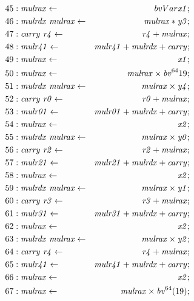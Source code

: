 {\begin{align*}
45 &: \mathit{mulrax} \leftarrow & bvVar \mathit{x1}; \\
46 &: \mathit{mulrdx}\ \mathit{mulrax} \leftarrow & \mathit{mulrax} * \mathit{y3}; \\
47 &: \mathit{carry}\ \mathit{r4} \leftarrow & \mathit{r4} + \mathit{mulrax}; \\
48 &: \mathit{mulr41} \leftarrow & \mathit{mulr41} + \mathit{mulrdx} + \mathit{carry}; \\
49 &: \mathit{mulrax} \leftarrow & \mathit{x1}; \\
50 &: \mathit{mulrax} \leftarrow & \mathit{mulrax} \times \bv^{64}{19}; \\
51 &: \mathit{mulrdx}\ \mathit{mulrax} \leftarrow & \mathit{mulrax} \times \mathit{y4}; \\
52 &: \mathit{carry}\ \mathit{r0} \leftarrow & \mathit{r0} + \mathit{mulrax}; \\
53 &: \mathit{mulr01} \leftarrow & \mathit{mulr01} + \mathit{mulrdx} + \mathit{carry}; \\
54 &: \mathit{mulrax} \leftarrow & \mathit{x2}; \\
55 &: \mathit{mulrdx}\ \mathit{mulrax} \leftarrow & \mathit{mulrax} \times \mathit{y0}; \\
56 &: \mathit{carry}\ \mathit{r2} \leftarrow & \mathit{r2} + \mathit{mulrax}; \\
57 &: \mathit{mulr21} \leftarrow & \mathit{mulr21} + \mathit{mulrdx} + \mathit{carry}; \\
58 &: \mathit{mulrax} \leftarrow & \mathit{x2}; \\
59 &: \mathit{mulrdx}\ \mathit{mulrax} \leftarrow & \mathit{mulrax} \times \mathit{y1}; \\
60 &: \mathit{carry}\ \mathit{r3} \leftarrow & \mathit{r3} + \mathit{mulrax}; \\
61 &: \mathit{mulr31} \leftarrow & \mathit{mulr31} + \mathit{mulrdx} + \mathit{carry}; \\
62 &: \mathit{mulrax} \leftarrow & \mathit{x2}; \\
63 &: \mathit{mulrdx}\ \mathit{mulrax} \leftarrow & \mathit{mulrax} \times \mathit{y2}; \\
64 &: \mathit{carry}\ \mathit{r4} \leftarrow & \mathit{r4} + \mathit{mulrax}; \\
65 &: \mathit{mulr41} \leftarrow & \mathit{mulr41} + \mathit{mulrdx} + \mathit{carry}; \\
66 &: \mathit{mulrax} \leftarrow & \mathit{x2}; \\
67 &: \mathit{mulrax} \leftarrow & \mathit{mulrax} \times \bv^{64}(19); \\

\end{align*}}
